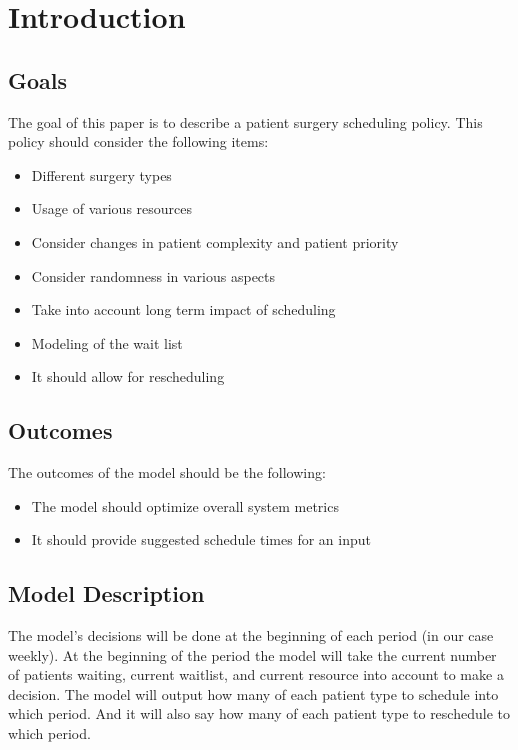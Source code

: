 \section{Introduction}

\subsection{Goals}
The goal of this paper is to describe a patient surgery scheduling policy. This policy should consider the following items:
\begin{itemize}
	\item Different surgery types
	\item Usage of various resources
	\item Consider changes in patient complexity and patient priority
	\item Consider randomness in various aspects
	\item Take into account long term impact of scheduling
	\item Modeling of the wait list 
	\item It should allow for rescheduling
\end{itemize}

\subsection{Outcomes}
The outcomes of the model should be the following:
\begin{itemize}
	\item The model should optimize overall system metrics
	\item It should provide suggested schedule times for an input
\end{itemize}

\subsection{Model Description}
The model's decisions will be done at the beginning of each period (in our case weekly). At the beginning of the period the model will take the current number of patients waiting, current waitlist, and current resource into account to make a decision. The model will output how many of each patient type to schedule into which period. And it will also say how many of each patient type to reschedule to which period.